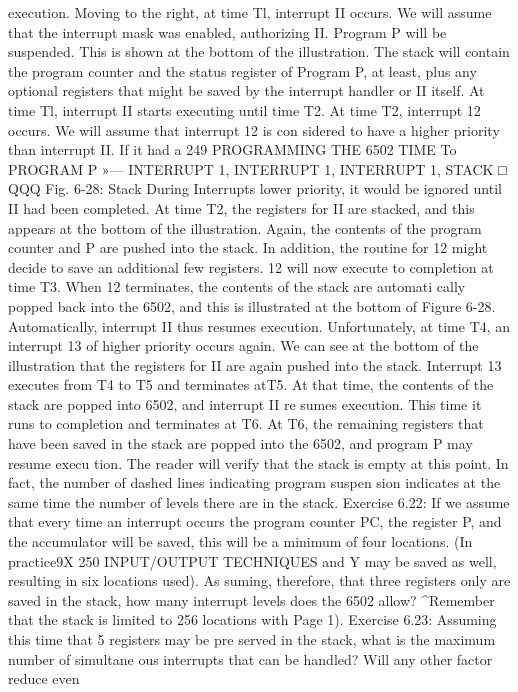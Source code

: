 execution. Moving to the right, at time Tl, interrupt II occurs. We
will assume that the interrupt mask was enabled, authorizing II.
Program P will be suspended. This is shown at the bottom of the
illustration. The stack will contain the program counter and the
status register of Program P, at least, plus any optional registers
that might be saved by the interrupt handler or II itself.
At time Tl, interrupt II starts executing until time T2. At time
T2, interrupt 12 occurs. We will assume that interrupt 12 is con
sidered to have a higher priority than interrupt II. If it had a
249
PROGRAMMING THE 6502
TIME To
PROGRAM P »—
INTERRUPT 1,
INTERRUPT 1,
INTERRUPT 1,
STACK □ QQQ
Fig. 6-28: Stack During Interrupts
lower priority, it would be ignored until II had been completed. At
time T2, the registers for II are stacked, and this appears at the
bottom of the illustration. Again, the contents of the program
counter and P are pushed into the stack. In addition, the routine
for 12 might decide to save an additional few registers. 12 will now
execute to completion at time T3.
When 12 terminates, the contents of the stack are automati
cally popped back into the 6502, and this is illustrated at the
bottom of Figure 6-28. Automatically, interrupt II thus resumes
execution. Unfortunately, at time T4, an interrupt 13 of higher
priority occurs again. We can see at the bottom of the illustration
that the registers for II are again pushed into the stack. Interrupt
13 executes from T4 to T5 and terminates atT5. At that time, the
contents of the stack are popped into 6502, and interrupt II re
sumes execution. This time it runs to completion and terminates
at T6. At T6, the remaining registers that have been saved in the
stack are popped into the 6502, and program P may resume execu
tion. The reader will verify that the stack is empty at this point.
In fact, the number of dashed lines indicating program suspen
sion indicates at the same time the number of levels there are in the
stack.
Exercise 6.22: If we assume that every time an interrupt occurs
the program counter PC, the register P, and the accumulator will
be saved, this will be a minimum of four locations. (In practice9X
250
INPUT/OUTPUT TECHNIQUES
and Y may be saved as well, resulting in six locations used). As
suming, therefore, that three registers only are saved in the stack,
how many interrupt levels does the 6502 allow? ^Remember that
the stack is limited to 256 locations with Page 1).
Exercise 6.23: Assuming this time that 5 registers may be pre
served in the stack, what is the maximum number of simultane
ous interrupts that can be handled? Will any other factor reduce even
